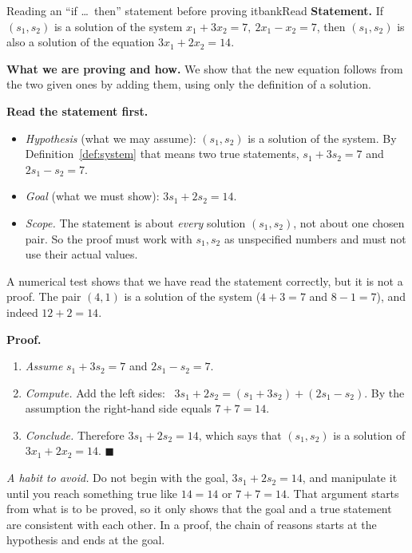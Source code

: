 \documentclass[11pt]{article}
\begin{document}
\begin{exmp}{Reading an ``if \dots\ then'' statement before proving it}{bankRead}
\textbf{Statement.} If $(s_1,s_2)$ is a solution of the system $x_1+3x_2=7,\ 2x_1-x_2=7$, then $(s_1,s_2)$ is also a solution of the equation $3x_1+2x_2=14$.

\textbf{What we are proving and how.} We show that the new equation follows from the two given ones by adding them, using only the definition of a solution.

\textbf{Read the statement first.}
\begin{itemize}
  \item \emph{Hypothesis} (what we may assume): $(s_1,s_2)$ is a solution of the system. By Definition~\ref{def:system} that means two true statements, $s_1+3s_2=7$ and $2s_1-s_2=7$.
  \item \emph{Goal} (what we must show): $3s_1+2s_2=14$.
  \item \emph{Scope.} The statement is about \emph{every} solution $(s_1,s_2)$, not about one chosen pair. So the proof must work with $s_1,s_2$ as unspecified numbers and must not use their actual values.
\end{itemize}
A numerical test shows that we have read the statement correctly, but it is not a proof. The pair $(4,1)$ is a solution of the system ($4+3=7$ and $8-1=7$), and indeed $12+2=14$.

\textbf{Proof.}
\begin{enumerate}[itemsep=2pt]
  \item \emph{Assume} $s_1+3s_2=7$ and $2s_1-s_2=7$.
  \item \emph{Compute.} Add the left sides: \ $3s_1+2s_2=(s_1+3s_2)+(2s_1-s_2)$. By the assumption the right-hand side equals $7+7=14$.
  \item \emph{Conclude.} Therefore $3s_1+2s_2=14$, which says that $(s_1,s_2)$ is a solution of $3x_1+2x_2=14$. \qquad$\blacksquare$
\end{enumerate}

\emph{A habit to avoid.} Do not begin with the goal, $3s_1+2s_2=14$, and manipulate it until you reach something true like $14=14$ or $7+7=14$. That argument starts from what is to be proved, so it only shows that the goal and a true statement are consistent with each other. In a proof, the chain of reasons starts at the hypothesis and ends at the goal.
\end{exmp}
\end{document}
